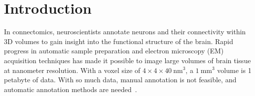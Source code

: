 \section{Introduction}



In connectomics, neuroscientists annotate neurons and their connectivity within 3D volumes to gain insight into the functional structure of the brain. Rapid progress in automatic sample preparation and electron microscopy (EM) acquisition techniques has made it possible to image large volumes of brain tissue at nanometer resolution. With a voxel size of $4\times4\times40~\text{nm}^3$, a $1~\text{mm}^3$ volume is 1 petabyte of data. With so much data, manual annotation is not feasible, and automatic annotation methods are needed~\cite{jain2010,Liu2014,GALA2014,kaynig2015large}.

